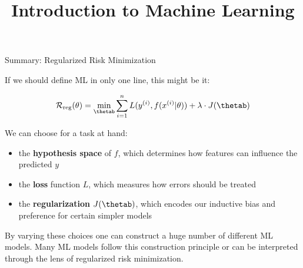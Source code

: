 



\newcommand{\titlefigure}{figure_man/bayes_reg.png}
\newcommand{\learninggoals}{
  \item Understand that regularization and parameter shrinkage can be applied to non-linear models
  \item Know structural risk minimization 
  \item Know how regularization risk minimization is the same as MAP 
      in a Bayesian perspective, where the penality corresponds to parameter prior.
}

\title{Introduction to Machine Learning}
\date{}





\begin{vbframe}{Summary: Regularized Risk Minimization}

If we should define ML in only one line, this might be it:

$$
\riskrt= \min_{\thetab} \sumin \Lxyit + \lambda \cdot J(\thetab)
$$

We can choose for a task at hand:

\begin{itemize}
  \item the \textbf{hypothesis space} of $f$, which determines how features can 
  influence the predicted $y$
  \item the \textbf{loss} function $L$, which measures how errors should be treated
  \item the \textbf{regularization} $J(\thetab)$, which encodes our inductive 
  bias and preference for certain simpler models
\end{itemize}

\vfill

By varying these choices one can construct a huge number of different ML models. 
Many ML models follow this construction principle or can be interpreted through 
the lens of regularized risk minimization.

\end{vbframe}


